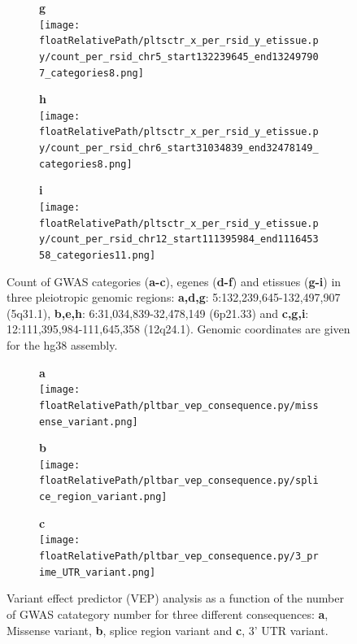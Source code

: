 \begin{figure}[!ht]
\begin{subfigure}[]{.33\textwidth}
\textbf{g}
\\
\texttt{[image: \\floatRelativePath/pltsctr\_x\_per\_rsid\_y\_etissue.py/count\_per\_rsid\_chr5\_start132239645\_end132497907\_categories8.png]}
\end{subfigure}
%
\begin{subfigure}[]{.33\textwidth}
\textbf{h}
\\
\texttt{[image: \\floatRelativePath/pltsctr\_x\_per\_rsid\_y\_etissue.py/count\_per\_rsid\_chr6\_start31034839\_end32478149\_categories8.png]}
\end{subfigure}
%
\begin{subfigure}[]{.33\textwidth}
\textbf{i}
\\
\texttt{[image: \\floatRelativePath/pltsctr\_x\_per\_rsid\_y\_etissue.py/count\_per\_rsid\_chr12\_start111395984\_end111645358\_categories11.png]}
\end{subfigure}

\caption{Count of GWAS categories (\textbf{a-c}), egenes (\textbf{d-f}) and etissues (\textbf{g-i}) in three pleiotropic genomic regions: \textbf{a,d,g}: 5:132,239,645-132,497,907 (5q31.1), \textbf{b,e,h}: 6:31,034,839-32,478,149 (6p21.33) and \textbf{c,g,i}: 12:111,395,984-111,645,358 (12q24.1). Genomic coordinates are given for the hg38 assembly.} \label{fig:region_gwas_egenes_tissues}
%
\end{figure}

%
%

\begin{figure}[!]
\centering
%
\begin{subfigure}[]{.33\textwidth}
\textbf{a}
\\
\texttt{[image: \\floatRelativePath/pltbar\_vep\_consequence.py/missense\_variant.png]}
%
\end{subfigure}
%
\begin{subfigure}[]{.33\textwidth}
\textbf{b}
\\
\texttt{[image: \\floatRelativePath/pltbar\_vep\_consequence.py/splice\_region\_variant.png]}
%
\end{subfigure}
%
\begin{subfigure}[]{.33\textwidth}
\textbf{c}
\\
\texttt{[image: \\floatRelativePath/pltbar\_vep\_consequence.py/3\_prime\_UTR\_variant.png]}
%
\end{subfigure}
%
\caption{Variant effect predictor (VEP) analysis as a function of the number of GWAS catategory number for three different consequences: \textbf{a}, Missense variant, \textbf{b}, splice region variant and \textbf{c}, 3' UTR variant.} \label{fig:vep_consequence}
%
\end{figure}

